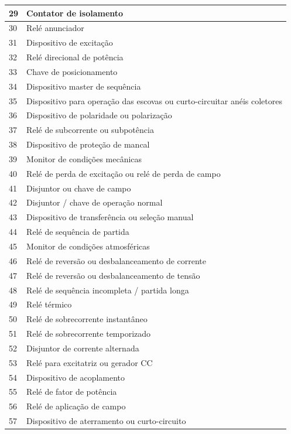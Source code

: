\documentclass[a5paper]{ufsc-thesis}
\begin{document}
\begin{longtable}{|l|l|}
  29 & Contator de isolamento \\ \hline
  30 & Relé anunciador \\ \hline
  31 & Dispositivo de excitação  \\ \hline
  32 & Relé direcional de potência \\ \hline
  33 & Chave de posicionamento \\ \hline
  34 & Dispositivo master de sequência \\ \hline
  35 & Dispositivo para operação das escovas ou curto-circuitar anéis coletores \\ \hline
  36 & Dispositivo de polaridade ou polarização \\ \hline
  37 & Relé de subcorrente ou subpotência \\ \hline
  38 & Dispositivo de proteção de mancal \\ \hline
  39 & Monitor de condições mecânicas \\ \hline
  40 & Relé de perda de excitação ou relé de perda de campo \\ \hline
  41 & Disjuntor ou chave de campo \\ \hline
  42 & Disjuntor / chave de operação normal \\ \hline
  43 & Dispositivo de transferência ou seleção manual \\ \hline
  44 & Relé de sequência de partida  \\ \hline
  45 & Monitor de condições atmosféricas \\ \hline
  46 & Relé de reversão ou desbalanceamento de corrente \\ \hline
  47 & Relé de reversão ou desbalanceamento de tensão \\ \hline
  48 & Relé de sequência incompleta / partida longa \\ \hline
  49 & Relé térmico \\ \hline
  50 & Relé de sobrecorrente instantâneo \\ \hline
  51 & Relé de sobrecorrente temporizado \\ \hline
  52 & Disjuntor de corrente alternada \\ \hline
  53 & Relé para excitatriz ou gerador CC \\ \hline
  54 & Dispositivo de acoplamento \\ \hline
  55 & Relé de fator de potência \\ \hline
  56 & Relé de aplicação de campo \\ \hline
  57 & Dispositivo de aterramento ou curto-circuito \\ \hline

\end{longtable}
\end{document}
